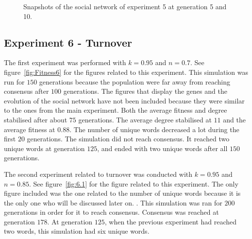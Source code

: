 \begin{figure}
    \centering
    \hfill
    \caption{Snapshots of the social network of experiment 5 at generation 5 and 10.}
    \label{fig:SN5}
\end{figure}

\subsection{Experiment 6 - Turnover}
The first experiment was performed with $k = 0.95$ and $n = 0.7$. See figure~\ref{fig:Fitness6} for the figures related to this experiment. This simulation was run for $150$ generations because the population were far away from reaching consensus after $100$ generations. The figures that display the genes and the evolution of the social network have not been included because they were similar to the ones from the main experiment. Both the average fitness and degree stabilised after about $75$ generations. The average degree stabilised at $11$ and the average fitness at $0.88$. The number of unique words decreased a lot during the first $20$ generations. The simulation did not reach consensus. It reached two unique words at generation $125$, and ended with two unique words after all $150$ generations.   

The second experiment related to turnover was conducted with $k = 0.95$ and $n = 0.85$. See figure~\ref{fig:6.1} for the figure related to this experiment. The only figure included was the one related to the number of unique words because it is the only one who will be discussed later on. . This simulation was ran for $200$ generations in order for it to reach consensus. Consensus was reached at generation $178$. At generation $125$, when the previous experiment had reached two words, this simulation had six unique words. 

